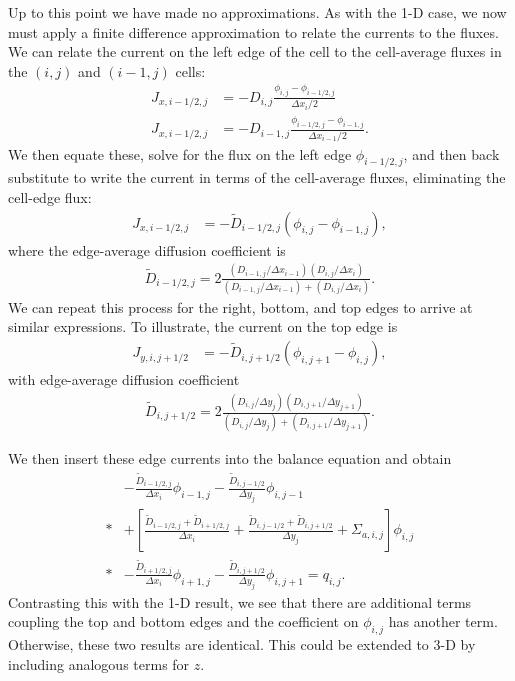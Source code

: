 Up to this point we have made no approximations. As with the 1-D case, we now must apply a finite difference approximation to relate the currents to the fluxes. We can relate the current on the left edge of the cell to the cell-average fluxes in the $(i,j)$ and $(i-1,j)$ cells:
\begin{align}
  J_{x,i-1/2,j} &= -D_{i,j} \frac{ \phi_{i,j} - \phi_{i-1/2,j} }{ \Delta x_i / 2 } \\
  J_{x,i-1/2,j} &= -D_{i-1,j} \frac{ \phi_{i-1/2,j} - \phi_{i-1,j} }{ \Delta x_{i-1} / 2 } .  
\end{align}
We then equate these, solve for the flux on the left edge $\phi_{i-1/2,j}$, and then back substitute to write the current in terms of the cell-average fluxes, eliminating the cell-edge flux:
\begin{align}
  J_{x,i-1/2,j} &= -\widetilde{D}_{i-1/2,j} \left( \phi_{i,j} - \phi_{i-1,j} \right) ,
\end{align}
where the edge-average diffusion coefficient is
\begin{align}
  \widetilde{D}_{i-1/2,j} = 2 \frac{ ( D_{i-1,j} / \Delta x_{i-1} ) ( D_{i,j} / \Delta x_{i} ) }{ ( D_{i-1,j} / \Delta x_{i-1} )  + ( D_{i,j} / \Delta x_{i} )  } .
\end{align}
We can repeat this process for the right, bottom, and top edges to arrive at similar expressions. To illustrate, the current on the top edge is
\begin{align}
  J_{y,i,j+1/2} &= -\widetilde{D}_{i,j+1/2} \left( \phi_{i,j+1} - \phi_{i,j} \right) ,
\end{align}
with edge-average diffusion coefficient
\begin{align}
  \widetilde{D}_{i,j+1/2} = 2 \frac{ ( D_{i,j} / \Delta y_j ) ( D_{i,j+1} / \Delta y_{j+1} ) }{ ( D_{i,j} / \Delta y_{j} )  + ( D_{i,j+1} / \Delta y_{j+1} )  } .
\end{align}

We then insert these edge currents into the balance equation and obtain
\begin{align}
  &- \frac{\widetilde{D}_{i-1/2,j}}{\Delta x_i} \phi_{i-1,j} -  \frac{\widetilde{D}_{i,j-1/2}}{\Delta y_j} \phi_{i,j-1} \nonumber \\*
  &+ \left[ \frac{ \widetilde{D}_{i-1/2,j} + \widetilde{D}_{i+1/2,j} }{ \Delta x_i } + \frac{ \widetilde{D}_{i,j-1/2} + \widetilde{D}_{i,j+1/2} }{ \Delta y_j } + \Sigma_{a,i,j}  \right] \phi_{i,j} \nonumber \\*
  &- \frac{\widetilde{D}_{i+1/2,j}}{\Delta x_i} \phi_{i+1,j} -  \frac{\widetilde{D}_{i,j+1/2}}{\Delta y_j} \phi_{i,j+1} = q_{i,j} . \label{Eq:diffusion_finiteDifference_2DDiffusionEquation}
\end{align}
Contrasting this with the 1-D result, we see that there are additional terms coupling the top and bottom edges and the coefficient on $\phi_{i,j}$ has another term. Otherwise, these two results are identical. This could be extended to 3-D by including analogous terms for $z$. 

